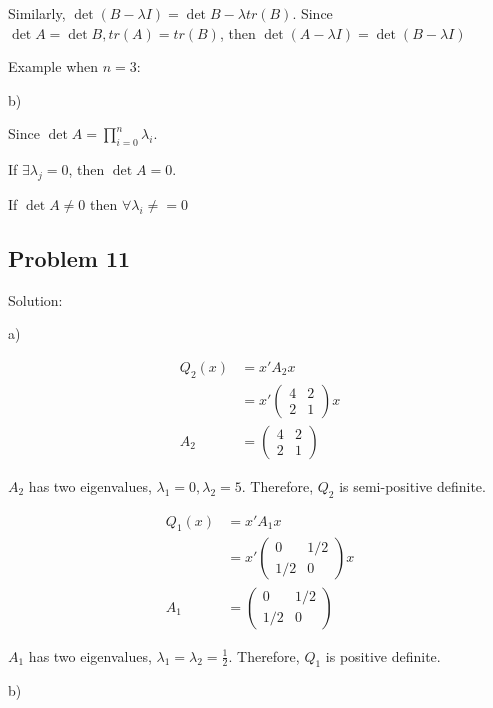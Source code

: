 \documentclass[letterpaper, 11pt]{article}
\newcommand{\1}{\mathds{1}}	%
\theoremstyle{definition}
\begin{document}
Similarly, $\det (B - \lambda I) = \det B - \lambda tr(B)$. Since $\det A = \det B, tr(A) = tr(B)$, then $\det (A-\lambda I)  = \det (B - \lambda I)$

Example when $n = 3$:


b)

Since $\det A = \prod_{i=0}^{n}\lambda_i$.

If $\exists \lambda_{j} = 0$, then $\det A = 0$.

If $\det A \neq 0$ then $\forall \lambda_{i} \neq =0$


\subsection*{Problem 11}

Solution:

a)

\begin{align*}
    Q_{2}(x)&=x'A_{2}x \\
    &=x'\begin{pmatrix}
        4 & 2 \\
        2 & 1
    \end{pmatrix}x \\
    A_{2}&= \begin{pmatrix}
        4 & 2 \\
        2 & 1
    \end{pmatrix}
\end{align*}

$A_{2} $ has two eigenvalues, $\lambda_{1} = 0, \lambda_{2}=5$. Therefore, $Q_{2}$ is semi-positive definite.

\begin{align*}
        Q_{1}(x)&=x'A_{1}x \\
        &= x'\begin{pmatrix}
            0 & 1/2 \\
            1/2 & 0
        \end{pmatrix}x \\
        A_{1}&=\begin{pmatrix}
            0 & 1/2 \\
            1/2 & 0
        \end{pmatrix}
\end{align*}

$A_{1}$ has two eigenvalues, $\lambda_{1}=\lambda_{2}=\frac{1}{2}$. Therefore, $Q_{1}$ is positive definite.


b)
\end{document}
